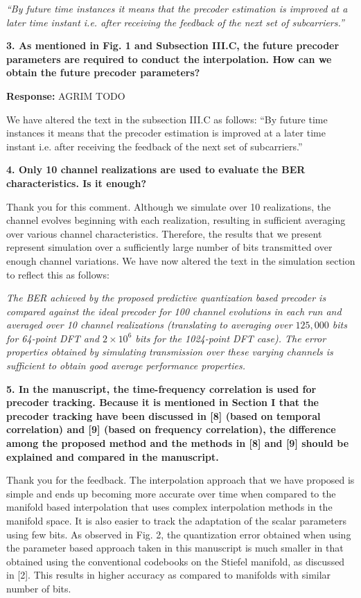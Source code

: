 \documentclass[12pt]{letter}
\begin{document}
\emph{``By
  future time instances it means that the precoder estimation is
  improved at a later time instant i.e.  after receiving the feedback
  of the next set of subcarriers.''}

\textbf{3. As mentioned in Fig. 1 and Subsection III.C, the future
  precoder parameters are required to conduct the interpolation. How
  can we obtain the future precoder parameters?}

\textbf{Response:} AGRIM TODO

We have altered the text in the subsection III.C as follows:
``By future time instances it means that the precoder estimation is improved
at a later time instant i.e. after receiving the feedback of the next set of
subcarriers.''

\textbf{4. Only 10 channel realizations are used to evaluate the BER characteristics. Is it enough?}

Thank you for this comment. Although we simulate over 10 realizations,
the channel evolves beginning with each realization, resulting in
sufficient averaging over various channel characteristics. Therefore,
the results that we present represent simulation over a sufficiently
large number of bits transmitted over enough channel variations. We
have now altered the text in the simulation section to reflect this as
follows:

\emph{The BER achieved by the proposed predictive quantization based
  precoder is compared against the ideal precoder for 100 channel
  evolutions in each run and averaged over 10 channel realizations
  (translating to averaging over $125,000$ bits for 64-point DFT and
  $2\times 10^6$ bits for the 1024-point DFT case). The error
  properties obtained by simulating transmission over these varying
  channels is sufficient to obtain good average performance
  properties.}

\textbf{5. In the manuscript, the time-frequency correlation is used for precoder tracking. Because it is mentioned in Section I that the precoder tracking have been discussed in [8] (based on temporal correlation) and [9] (based on frequency correlation), the difference among the proposed method and the methods in [8] and [9] should be explained and compared in the manuscript.}

Thank you for the feedback. The interpolation approach that we have
proposed is simple and ends up becoming more accurate over time when
compared to the manifold based interpolation that uses complex
interpolation methods in the manifold space. It is also easier to
track the adaptation of the scalar parameters using few bits. As
observed in Fig. 2, the quantization error obtained when using the
parameter based approach taken in this manuscript is much smaller in
that obtained using the conventional codebooks on the Stiefel
manifold, as discussed in [2]. This results in higher accuracy as
compared to manifolds with similar number of bits.
\end{document}
